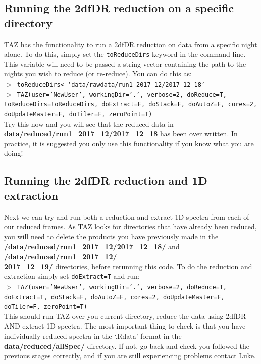 \documentclass[12pt]{article}
\begin{document}
\subsection{Running the 2dfDR reduction on a specific directory}

TAZ has the functionality to run a 2dfDR reduction on data from a specific night alone. To do this, simply set the \texttt{toReduceDirs} keyword in the command line. This variable will need to be passed a string vector containing the path to the nights you wish to reduce (or re-reduce). You can do this as: \\


\hspace{10mm} \texttt{$>$ toReduceDirs<-`data/rawdata/run1\_2017\_12/2017\_12\_18'}\\
\hspace{10mm} \texttt{$>$ TAZ(user='NewUser', workingDir='.', verbose=2, doReduce=T, toReduceDirs=toReduceDirs, doExtract=F, doStack=F, doAutoZ=F, cores=2, doUpdateMaster=F, doTiler=F, zeroPoint=T)}\\

Try this now and you will see that the reduced data in \textbf{data/reduced/run1\_2017\_12/2017\_12\_18} has been over written. In practice, it is suggested you only use this functionality if you know what you are doing!
 

\subsection{Running the 2dfDR reduction and 1D extraction}

Next we can try and run both a reduction and extract 1D spectra from each of our reduced frames. As TAZ looks for directories that have already been reduced, you will need to delete the products you have previously made in the \textbf{/data/reduced/run1\_2017\_12/2017\_12\_18/} and \textbf{/data/reduced/run1\_2017\_12/ \\ 2017\_12\_19/} directories, before rerunning this code. To do the reduction and extraction simply set \texttt{doExtract=T} and run:\\

\hspace{10mm} \texttt{$>$ TAZ(user='NewUser', workingDir='.', verbose=2, doReduce=T, doExtract=T, doStack=F, doAutoZ=F, cores=2, doUpdateMaster=F, doTiler=F, zeroPoint=T)}\\

This should run TAZ over you current directory, reduce the data using 2dfDR AND extract 1D spectra. The most important thing to check is that you have individually reduced spectra in the `.Rdata' format in the \textbf{data/reduced/allSpec/} directory. If not, go back and check you followed the previous stages correctly, and if you are still experiencing problems contact Luke.  \\
\end{document}

